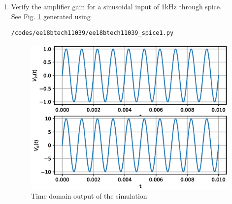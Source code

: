 \begin{enumerate}[label=\arabic*.,ref=\theenumi]
%
%
%
%
%
%
%
\item Verify the amplifier gain for a sinusoidal input of 1kHz through spice.
\\
\solution See Fig. \ref{fig:ee18btech11039_fig6} generated using
\begin{lstlisting}
/codes/ee18btech11039/ee18btech11039_spice1.py
\end{lstlisting}
%
\begin{figure}[!h]
		\includegraphics[width=\columnwidth]{./figs/ee18btech11039/spice_1.eps}
\caption{Time domain output of the simulation}
\label{fig:ee18btech11039_fig6}
\end{figure}


\end{enumerate}
